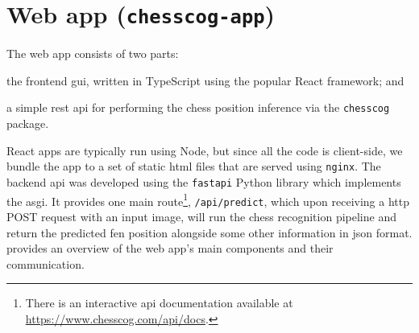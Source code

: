 \documentclass[../report.tex]{subfiles}
\begin{document}
\section{Web app (\texttt{chesscog-app})}
\label{sec:implementation_chesscogapp}
The web app consists of two parts:
\begin{enumerate*}[label=(\roman*)]
    \item the frontend \gls{gui}, written in TypeScript using the popular React framework; and
    \item a simple \gls{rest} \gls{api} for performing the chess position inference via the \texttt{chesscog} package.
\end{enumerate*}
React apps are typically run using Node, but since all the code is client-side, we bundle the app to a set of static \gls{html} files that are served using \texttt{nginx}.
The backend \gls{api} was developed using the \texttt{fastapi} Python library which implements the \gls{asgi}.
It provides one main route\footnote{There is an interactive \gls{api} documentation available at \url{https://www.chesscog.com/api/docs}.}, \texttt{/api/predict}, which upon receiving a \gls{http} POST request with an input image, will run the chess recognition pipeline and return the predicted \gls{fen} position alongside some other information in \gls{json} format.
 provides an overview of the web app's main components and their communication.
\end{document}
